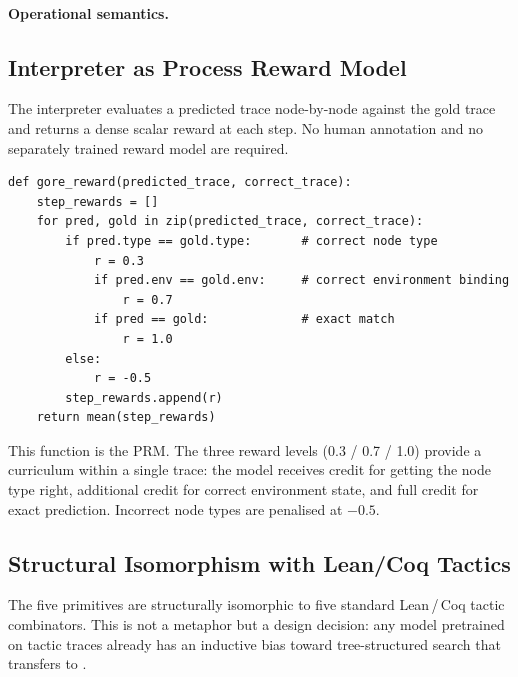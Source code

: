 \paragraph{Operational semantics.}

\subsection{Interpreter as Process Reward Model}
\label{sec:interpreter-prm}

The \gore{} interpreter evaluates a predicted trace node-by-node against the
gold trace and returns a dense scalar reward at each step.
No human annotation and no separately trained reward model are required.

\begin{verbatim}
def gore_reward(predicted_trace, correct_trace):
    step_rewards = []
    for pred, gold in zip(predicted_trace, correct_trace):
        if pred.type == gold.type:       # correct node type
            r = 0.3
            if pred.env == gold.env:     # correct environment binding
                r = 0.7
            if pred == gold:             # exact match
                r = 1.0
        else:
            r = -0.5
        step_rewards.append(r)
    return mean(step_rewards)
\end{verbatim}

This function is the PRM.
The three reward levels (0.3 / 0.7 / 1.0) provide a curriculum within a single
trace: the model receives credit for getting the node type right, additional
credit for correct environment state, and full credit for exact prediction.
Incorrect node types are penalised at $-0.5$.


\subsection{Structural Isomorphism with Lean/Coq Tactics}
\label{sec:isomorphism}

The five \gore{} primitives are structurally isomorphic to five standard
Lean\,/\,Coq tactic combinators.
This is not a metaphor but a design decision: any model pretrained on tactic
traces already has an inductive bias toward tree-structured search that
transfers to \gore{}.

